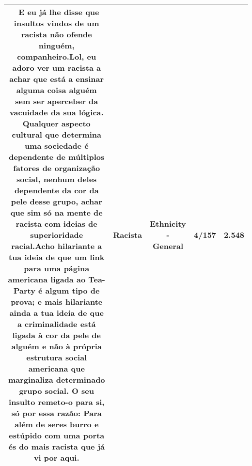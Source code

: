 \documentclass[11pt]{article}
\newlength\mylength
\begin{document}
\begin{center}
\begin{longtable}{|C{.65\mylength}|C{.30\mylength}|C{.12\mylength}|C{.12\mylength}|C{.12\mylength}|}
  \small {} E eu já lhe disse que insultos vindos de um \textbf{racista} não ofende ninguém, companheiro.Lol, eu adoro ver um \textbf{racista} a achar que está a ensinar alguma coisa alguém sem ser aperceber da vacuidade da sua lógica. Qualquer aspecto cultural que determina uma sociedade é dependente de múltiplos fatores de organização social, nenhum deles dependente da cor da pele desse grupo, achar que sim só na mente de \textbf{racista} com ideias de superioridade racial.Acho hilariante a tua ideia de que um link para uma página americana ligada ao Tea-Party é algum tipo de prova; e mais hilariante ainda a tua ideia de que a criminalidade está ligada à cor da pele de alguém e não à própria estrutura social americana que marginaliza determinado grupo social. O seu insulto remeto-o para si, só por essa razão: Para além de seres burro e estúpido com uma porta és do mais \textbf{racista} que já vi por aqui.\normalsize   & Racista & Ethnicity - General & 4/157 & 2.548 \\  \hline

\end{longtable}
\end{center}
\end{document}
